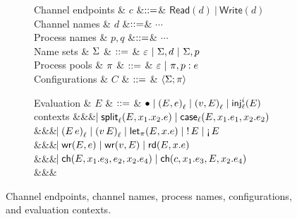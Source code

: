 \begin{figure*}[t]
\centering
\begin{subfigure}{0.48\textwidth}
\begin{grammar}
  Channel endpoints & $c$   &$\bnfas$& $\mathsf{Read}(d) ~|~ \mathsf{Write}(d)$
  \\
  Channel names & $d$ &$\bnfas$& $\cdots$
  \\  
  Process names & $p,q$ &$\bnfas$& $\cdots$
  \\
  Name sets
  & $\Names$ 
    & $\bnfas$ & $\emptyNames ~|~ \Names, d ~|~ \Names, p$
  \\
  Process pools
  & $\Procs$ 
  & $\bnfas$ & $\emptyProcs ~|~ \Procs, \ProcNm{p} \proc{e}$
  \\
  Configurations
  & $C$
     & $\bnfas$ & $\Config{\Names}{}{\Procs} $
\end{grammar}
\end{subfigure}%
\begin{subfigure}{0.48\textwidth}
  \begin{grammar}
 Evaluation
  & $E$
 & $\bnfas$ &
$\bullet \bnfalt \ePair{E}{e}{\ell} \bnfalt \ePair{v}{E}{\ell} \bnfalt \eInjj{\ell}{i}{E}$ 
\\ contexts &&& $\bnfaltbrk \eSplitt{\ell}{E}{x_1}{x_2}{e} \bnfalt
\eCase{\ell}{E}{x_1}{e_1}{x_2}{e_2}$
\\ &&& $\bnfaltbrk \eApp{E}{e}{\ell} \bnfalt \eApp{v}{E}{\ell}  \bnfalt \eLet{x}{E}{e}
\bnfalt \eBang{E} \bnfalt \eUnbang{E}$
\\ &&& $\bnfaltbrk \eWr{E}{e} \bnfalt \eWr{v}{E} \bnfalt \eLetRd{E}{x}{e}$
\\ &&& $\bnfaltbrk \eChoicee{E}{x_1}{e_3}{e_2}{x_2}{e_4} \bnfalt
\eChoicee{c}{x_1}{e_3}{E}{x_2}{e_4}$
\\ &&&
\end{grammar}
\end{subfigure}
\caption{Channel endpoints, channel names, process names, configurations, and evaluation contexts.}
\label{fig:configs}
\end{figure*}


